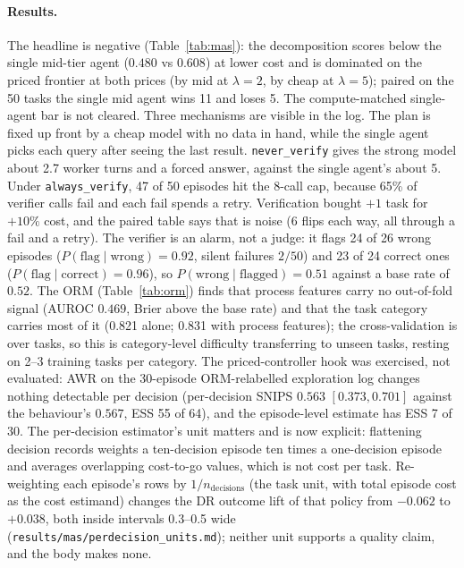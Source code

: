 \documentclass[10pt]{article}
\newcommand{\code}[1]{\texttt{#1}}
\begin{document}
\paragraph{Results.} The headline is negative (Table~\ref{tab:mas}): the decomposition scores below the single mid-tier agent ($0.480$ vs $0.608$) at lower cost and is dominated on the priced frontier at both prices (by mid at $\lambda=2$, by cheap at $\lambda=5$); paired on the 50 tasks the single mid agent wins 11 and loses 5. The compute-matched single-agent bar is not cleared. Three mechanisms are visible in the log. The plan is fixed up front by a cheap model with no data in hand, while the single agent picks each query after seeing the last result. \code{never\_verify} gives the strong model about 2.7 worker turns and a forced answer, against the single agent's about 5. Under \code{always\_verify}, 47 of 50 episodes hit the 8-call cap, because 65\% of verifier calls fail and each fail spends a retry. Verification bought $+1$ task for $+10\%$ cost, and the paired table says that is noise (6 flips each way, all through a fail and a retry). The verifier is an alarm, not a judge: it flags 24 of 26 wrong episodes ($P(\text{flag}\mid\text{wrong})=0.92$, silent failures $2/50$) and 23 of 24 correct ones ($P(\text{flag}\mid\text{correct})=0.96$), so $P(\text{wrong}\mid\text{flagged})=0.51$ against a base rate of $0.52$. The ORM (Table~\ref{tab:orm}) finds that process features carry no out-of-fold signal (AUROC $0.469$, Brier above the base rate) and that the task category carries most of it (0.821 alone; 0.831 with process features); the cross-validation is over tasks, so this is category-level difficulty transferring to unseen tasks, resting on 2--3 training tasks per category. The priced-controller hook was exercised, not evaluated: AWR on the 30-episode ORM-relabelled exploration log changes nothing detectable per decision (per-decision SNIPS $0.563$ $[0.373,0.701]$ against the behaviour's $0.567$, ESS 55 of 64), and the episode-level estimate has ESS 7 of 30. The per-decision estimator's unit matters and is now explicit: flattening decision records weights a ten-decision episode ten times a one-decision episode and averages overlapping cost-to-go values, which is not cost per task. Re-weighting each episode's rows by $1/n_{\text{decisions}}$ (the task unit, with total episode cost as the cost estimand) changes the DR outcome lift of that policy from $-0.062$ to $+0.038$, both inside intervals 0.3--0.5 wide (\code{results/mas/perdecision\_units.md}); neither unit supports a quality claim, and the body makes none.
\end{document}
